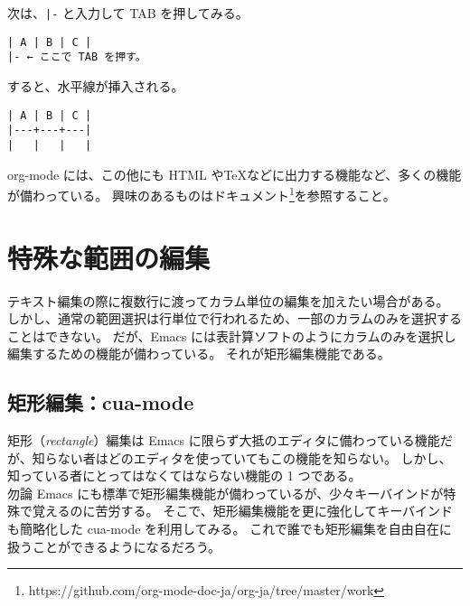 次は、\texttt{|-} と入力して TAB を押してみる。
\begin{mdframed}[roundcorner=0.50zw,leftmargin=3.00zw,rightmargin=3.00zw,skipabove=0.40zw,skipbelow=0.40zw,innertopmargin=4.00pt,innerbottommargin=4.00pt,innerleftmargin=5.00pt,innerrightmargin=5.00pt,linecolor=gray!020,linewidth=0.50pt,backgroundcolor=gray!20]
\begin{verbatim}
| A | B | C |
|- ← ここで TAB を押す。
\end{verbatim}
\end{mdframed}
すると、水平線が挿入される。
\begin{mdframed}[roundcorner=0.50zw,leftmargin=3.00zw,rightmargin=3.00zw,skipabove=0.40zw,skipbelow=0.40zw,innertopmargin=4.00pt,innerbottommargin=4.00pt,innerleftmargin=5.00pt,innerrightmargin=5.00pt,linecolor=gray!020,linewidth=0.50pt,backgroundcolor=gray!20]
\begin{verbatim}
| A | B | C |
|---+---+---|
|   |   |   |
\end{verbatim}
\end{mdframed}
org-mode には、この他にも HTML や\TeX{}などに出力する機能など、多くの機能が備わっている。
興味のあるものはドキュメント\footnote{https://github.com/org-mode-doc-ja/org-ja/tree/master/work}を参照すること。
\section{特殊な範囲の編集}
テキスト編集の際に複数行に渡ってカラム単位の編集を加えたい場合がある。
しかし、通常の範囲選択は行単位で行われるため、一部のカラムのみを選択することはできない。
だが、Emacs には表計算ソフトのようにカラムのみを選択し編集するための機能が備わっている。
それが矩形編集機能である。
\subsection{矩形編集：cua-mode}
矩形（\emph{rectangle}）編集は Emacs に限らず大抵のエディタに備わっている機能だが、知らない者はどのエディタを使っていてもこの機能を知らない。
しかし、知っている者にとってはなくてはならない機能の 1 つである。\\

勿論 Emacs にも標準で矩形編集機能が備わっているが、少々キーバインドが特殊で覚えるのに苦労する。
そこで、矩形編集機能を更に強化してキーバインドも簡略化した cua-mode を利用してみる。
これで誰でも矩形編集を自由自在に扱うことができるようになるだろう。
